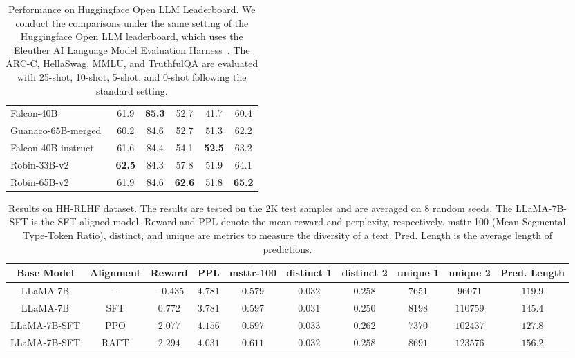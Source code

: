 \documentclass[11pt]{article}
\begin{document}
\begin{table}[t]
\begin{tabular}{l|c|c|c|c|c}
Falcon-40B~\citep{refinedweb}  & 61.9 & \textbf{85.3} & 52.7 & 41.7 & 60.4 \\
Guanaco-65B-merged~\citep{dettmers2023qlora}  & 60.2 & 84.6 & 52.7 & 51.3 & 62.2 \\
Falcon-40B-instruct~\citep{refinedweb}  & 61.6 & 84.4 & 54.1 & \textbf{52.5} & 63.2 \\
Robin-33B-v2 & \textbf{62.5} & 84.3 & 57.8 & 51.9 & 64.1  \\
Robin-65B-v2 & 61.9 & 84.6 & \textbf{62.6} & 51.8 & \textbf{65.2}  \\
\bottomrule
\end{tabular}
\caption{Performance on Huggingface Open LLM Leaderboard.
We conduct the comparisons under the same setting of the Huggingface Open LLM leaderboard, which uses the Eleuther AI Language Model Evaluation Harness~\citep{eval-harness}.
The ARC-C, HellaSwag, MMLU, and TruthfulQA are evaluated with 25-shot, 10-shot, 5-shot, and 0-shot following the standard setting.
}
\label{tab:openllm}
\end{table}



\begin{table}
\setlength{\tabcolsep}{2pt}
    \centering 
    \footnotesize
    \begin{tabular}{cc|cc|cccccc}
    \toprule
  Base Model & Alignment  & Reward  & PPL & msttr-100 & distinct 1 & distinct 2 & unique 1 & unique 2 & Pred. Length  \\
     \midrule
     LLaMA-7B & - &$-0.435$ & $4.781$ & $0.579$ & $0.032$ & $0.258$& $7651$ & $96071$ & $119.9$\\
          \midrule
    LLaMA-7B & SFT &$0.772$ & $3.781$ & $0.597$ & $0.031$ & $0.250$ & $8198$ & $110759 $ & $145.4$\\
          \midrule
    LLaMA-7B-SFT &PPO &$2.077$ & $4.156$ & $0.597$ & $0.033$ & $0.262$ & $7370$ & $102437 $ & $127.8$\\
                  \midrule
  LLaMA-7B-SFT &RAFT& $2.294$ & $4.031$ & $0.611$ & $0.032$ & $0.258$ & $8691$ & $123576 $ & $156.2$\\
       \bottomrule
        \end{tabular}
    \caption{Results on HH-RLHF dataset.
    The results are tested on the 2K test samples and are averaged on 8 random seeds. 
    The LLaMA-7B-SFT is the SFT-aligned model.
    Reward and PPL denote the mean reward and perplexity, respectively. 
    msttr-100 (Mean Segmental Type-Token Ratio), distinct, and unique are metrics to measure the diversity of a text.
    Pred. Length is the average length of predictions.
    }
    \label{tab:complete_result_hh_rlhf}
\end{table}
\end{document}
